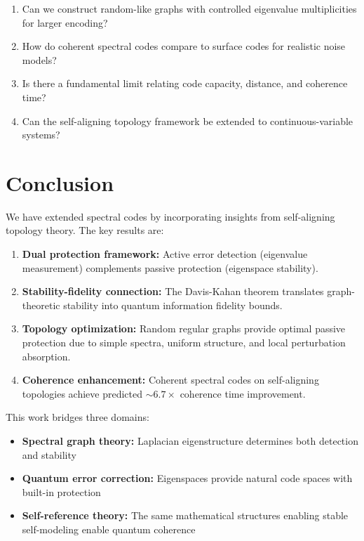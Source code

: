 \documentclass[11pt,a4paper]{article}
\theoremstyle{definition}
\begin{document}
\begin{enumerate}
    \item Can we construct random-like graphs with controlled eigenvalue multiplicities for larger encoding?
    
    \item How do coherent spectral codes compare to surface codes for realistic noise models?
    
    \item Is there a fundamental limit relating code capacity, distance, and coherence time?
    
    \item Can the self-aligning topology framework be extended to continuous-variable systems?
\end{enumerate}

\section{Conclusion}
\label{sec:conclusion}

We have extended spectral codes by incorporating insights from self-aligning topology theory. The key results are:

\begin{enumerate}
    \item \textbf{Dual protection framework:} Active error detection (eigenvalue measurement) complements passive protection (eigenspace stability).
    
    \item \textbf{Stability-fidelity connection:} The Davis-Kahan theorem translates graph-theoretic stability into quantum information fidelity bounds.
    
    \item \textbf{Topology optimization:} Random regular graphs provide optimal passive protection due to simple spectra, uniform structure, and local perturbation absorption.
    
    \item \textbf{Coherence enhancement:} Coherent spectral codes on self-aligning topologies achieve predicted $\sim 6.7\times$ coherence time improvement.
\end{enumerate}

This work bridges three domains:
\begin{itemize}[noitemsep]
    \item \textbf{Spectral graph theory:} Laplacian eigenstructure determines both detection and stability
    \item \textbf{Quantum error correction:} Eigenspaces provide natural code spaces with built-in protection
    \item \textbf{Self-reference theory:} The same mathematical structures enabling stable self-modeling enable quantum coherence
\end{itemize}
\end{document}
